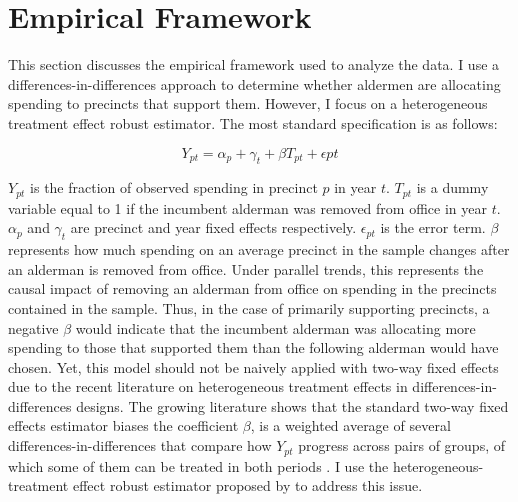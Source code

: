 \section{Empirical Framework}\label{sec:empframe}
This section discusses the empirical framework used to analyze the data.
I use a differences-in-differences approach to determine whether aldermen are allocating spending to precincts that support them.
However, I focus on a heterogeneous treatment effect robust estimator.
The most standard specification is as follows:

\begin{equation}\label{eq:standard_did}
    Y_{pt} = \alpha_{p} + \gamma_{t} + \beta T_{pt} + \epsilon{pt}
\end{equation}

$Y_{pt}$ is the fraction of observed spending in precinct $p$ in year $t$. $T_{pt}$ is a dummy variable equal to 1 if the incumbent alderman was removed from office in year $t$. $\alpha_{p}$ and $\gamma_{t}$ are precinct and year fixed effects respectively. $\epsilon_{pt}$ is the error term.
$\beta$ represents how much spending on an average precinct in the sample changes after an alderman is removed from office.
Under parallel trends, this represents the causal impact of removing an alderman from office on spending in the precincts contained in the sample.
Thus, in the case of primarily supporting precincts, a negative $\beta$ would indicate that the incumbent alderman was allocating more spending to those that supported them than the following alderman would have chosen.
Yet, this model should not be naively applied with two-way fixed effects due to the recent literature on heterogeneous treatment effects in differences-in-differences designs.
The growing literature shows that the standard two-way fixed effects estimator biases the coefficient $\beta$, is a weighted average of several differences-in-differences that compare how $Y_{pt}$ progress across pairs of groups, of which some of them can be treated in both periods \citep{chaisetwfe} \citep{callaway2021_continuous}. 
I use the heterogeneous-treatment effect robust estimator proposed by \citep{CALLAWAY2021200} to address this issue.

